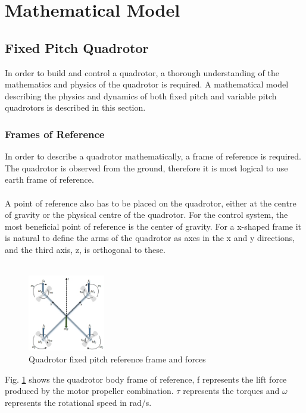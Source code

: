 \section{Mathematical Model}
\subsection{Fixed Pitch Quadrotor}
In order to  build and control a quadrotor, a thorough understanding of the mathematics and physics of the quadrotor is required. A mathematical model describing the physics and dynamics of both fixed pitch and variable pitch quadrotors is described in this section. 
\subsubsection{Frames of Reference}
In order to describe a quadrotor mathematically, a frame of reference is required. The quadrotor is observed from the ground, therefore it is most logical to use earth frame of reference.
\\\\
A point of reference also has to be placed on the quadrotor, either at the centre of gravity or the physical centre of the quadrotor. For the control system, the most beneficial point of reference is the center of gravity. For a x-shaped frame it is natural to define the arms of the quadrotor as axes in the x and y directions, and the third axis, z, is orthogonal to these. 
\\\\
\begin{figure}[H]
    \centering
    \includegraphics[width = 0.3\textwidth]{VAPIQ-PICTURES/MMFPQ.jpg}
    \caption{Quadrotor fixed pitch reference frame and forces}
    \label{fig:quadDynamics}
\end{figure}
\noindent
Fig. \ref{fig:quadDynamics} shows the quadrotor body frame of reference, f represents the lift force produced by the motor propeller combination. $\tau$ represents the torques and $\omega$ represents the rotational speed in rad/s.
\\\\
